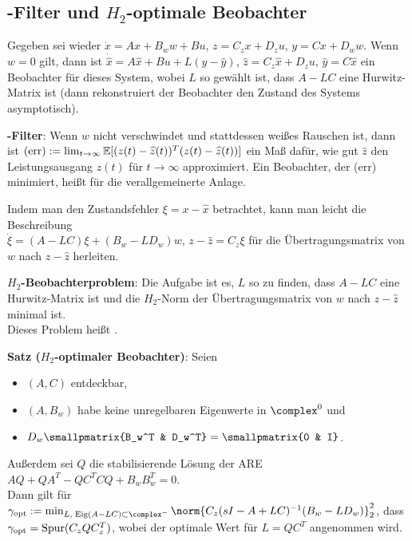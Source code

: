 \pagebreak

\subsection{%
    -Filter und \texorpdfstring{$H_2$-optimale}{H₂-optimale} Beobachter%
}

Gegeben sei wieder $\dot{x} = Ax + B_w w + Bu$,
$z = C_z x + D_z u$, $y = Cx + D_w w$.
Wenn $w = 0$ gilt, dann ist
$\dot{\widehat{x}} = A\widehat{x} + Bu + L(y - \widehat{y})$,
$\widehat{z} = C_z \widehat{x} + D_z u$,
$\widehat{y} = C\widehat{x}$
ein Beobachter für dieses System, wobei $L$ so gewählt ist, dass $A - LC$ eine Hurwitz-Matrix ist
(dann rekonstruiert der Beobachter den Zustand des Systems asymptotisch).

\textbf{-Filter}:
Wenn $w$ nicht verschwindet und stattdessen weißes Rauschen ist, dann ist
$\text{(err)} := \lim_{t \to \infty} \mathbb{E}[(z(t) - \widehat{z}(t))^T (z(t) - \widehat{z}(t))]$
ein Maß dafür, wie gut $\widehat{z}$ den Leistungsausgang $z(t)$ für $t \to \infty$ approximiert.
Ein Beobachter, der (err) minimiert, heißt  für die
verallgemeinerte Anlage.

Indem man den Zustandsfehler $\xi = x - \widehat{x}$ betrachtet, kann man leicht die Beschreibung\\
$\dot{\xi} = (A - LC)\xi + (B_w - LD_w) w$,
$z - \widehat{z} = C_z \xi$
für die Übertragungsmatrix von $w$ nach $z - \widehat{z}$ herleiten.

\textbf{$H_2$-Beobachterproblem}:
Die Aufgabe ist es, $L$ so zu finden, dass
$A - LC$ eine Hurwitz-Matrix ist und die $H_2$-Norm der Übertragungsmatrix von $w$ nach
$z - \widehat{z}$ minimal ist.\\
Dieses Problem heißt .

\linie

\textbf{Satz ($H_2$-optimaler Beobachter)}:
Seien
\begin{itemize}
    \item
    $(A, C)$ entdeckbar,
    
    \item
    $(A, B_w)$ habe keine unregelbaren Eigenwerte in $\complex^0$ und
    
    \item
    $D_w \smallpmatrix{B_w^T & D_w^T} = \smallpmatrix{0 & I}$.
\end{itemize}
Außerdem sei $Q$ die stabilisierende Lösung der ARE $AQ + QA^T - QC^T CQ + B_w B_w^T = 0$.\\
Dann gilt für
$\gamma_\opt := \min_{L,\;\Eig(A-LC)\subset\complex^-}
\norm{C_z (sI - A + LC)^{-1} (B_w - LD_w)}_2^2$, dass\\
$\gamma_{\text{opt}} = \operatorname{Spur}(C_z Q C_z^T)$, wobei der optimale Wert für $L = QC^T$ angenommen wird.

